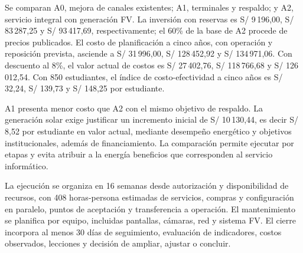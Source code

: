 Se comparan A0, mejora de canales existentes; A1, terminales y respaldo; y A2, servicio integral con generación FV. La inversión con reservas es S/ 9\,196,00, S/ 83\,287,25 y S/ 93\,417,69, respectivamente; el 60\% de la base de A2 procede de precios publicados. El costo de planificación a cinco años, con operación y reposición prevista, asciende a S/ 31\,996,00, S/ 128\,452,92 y S/ 134\,971,06. Con descuento al 8\%, el valor actual de costos es S/ 27\,402,76, S/ 118\,766,68 y S/ 126\,012,54. Con 850 estudiantes, el índice de costo-efectividad a cinco años es S/ 32,24, S/ 139,73 y S/ 148,25 por estudiante.

A1 presenta menor costo que A2 con el mismo objetivo de respaldo. La generación solar exige justificar un incremento inicial de S/ 10\,130,44, es decir S/ 8,52 por estudiante en valor actual, mediante desempeño energético y objetivos institucionales, además de financiamiento. La comparación permite ejecutar por etapas y evita atribuir a la energía beneficios que corresponden al servicio informático.

La ejecución se organiza en 16 semanas desde autorización y disponibilidad de recursos, con 408 horas-persona estimadas de servicios, compras y configuración en paralelo, puntos de aceptación y transferencia a operación. El mantenimiento se planifica por equipo, incluidas pantallas, cámaras, red y sistema FV. El cierre incorpora al menos 30 días de seguimiento, evaluación de indicadores, costos observados, lecciones y decisión de ampliar, ajustar o concluir.

\clearpage
\begingroup\small{}\setlength{\parskip}{0pt}\tableofcontents\endgroup
\clearpage
\begingroup\small{}\listoftables\endgroup
\clearpage
\begingroup\small{}\listoffigures\endgroup
\clearpage{}









\clearpage
\clearpage\appendix
\clearpage
